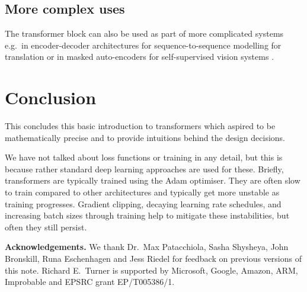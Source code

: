 \documentclass{article}
\begin{document}
\subsection{More complex uses}

The transformer block can also be used as part of more complicated systems e.g.~in encoder-decoder architectures for sequence-to-sequence modelling for translation \citep{devlin-etal-2019-bert,NIPS2017_3f5ee243} or in masked auto-encoders for self-supervised vision systems \citep{he2021masked-autoencoders}.

\section{Conclusion}

This concludes this basic introduction to transformers which aspired to be mathematically precise and to provide intuitions behind the design decisions. 

We have not talked about loss functions or training in any detail, but this is because rather standard deep learning approaches are used for these. Briefly, transformers are typically trained using the Adam optimiser. They are often slow to train compared to other architectures and typically get more unstable as training progresses. Gradient clipping, decaying learning rate schedules, and increasing batch sizes through training help to mitigate these instabilities, but often they still persist.

\vspace{3mm}
{\bf Acknowledgements.} We thank Dr.~Max Patacchiola, Sasha Shysheya, John Bronskill, Runa Eschenhagen and Jess Riedel for feedback on previous versions of this note. Richard E.~Turner is supported by Microsoft, Google, Amazon, ARM, Improbable and EPSRC grant EP/T005386/1.



 
\end{document}
